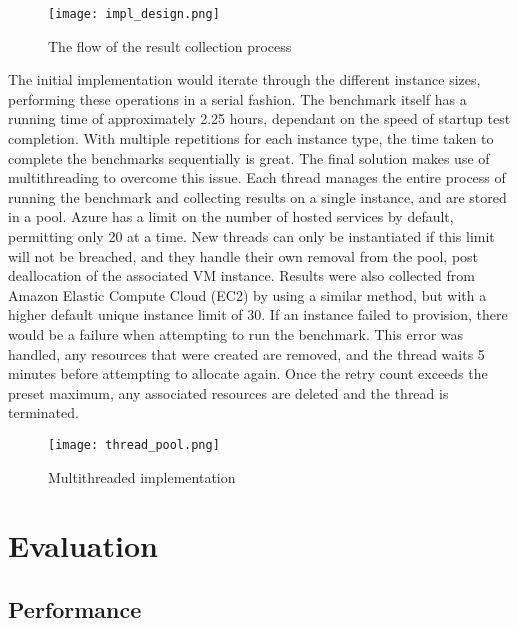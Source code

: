 \documentclass[conference]{IEEEtran}
\begin{document}
\begin{figure}[ht]
  \centering
  \texttt{[image: impl\_design.png]}
  \caption{The flow of the result collection process}
  \label{fig:impldesign}
\end{figure}

The initial implementation would iterate through the different instance sizes, performing these operations in a serial fashion. The benchmark itself has a running time of approximately 2.25 hours, dependant on the speed of startup test completion. With multiple repetitions for each instance type, the time taken to complete the benchmarks sequentially is great. The final solution makes use of multithreading to overcome this issue. Each thread manages the entire process of running the benchmark and collecting results on a single instance, and are stored in a pool. Azure has a limit on the number of hosted services by default, permitting only 20 at a time. New threads can only be instantiated if this limit will not be breached, and they handle their own removal from the pool, post deallocation of the associated VM instance. Results were also collected from Amazon Elastic Compute Cloud (EC2) by using a similar method, but with a higher default unique instance limit of 30. If an instance failed to provision, there would be a failure when attempting to run the benchmark. This error was handled, any resources that were created are removed, and the thread waits 5 minutes before attempting to allocate again. Once the retry count exceeds the preset maximum, any associated resources are deleted and the thread is terminated.

\begin{figure}[ht]
  \centering
  \texttt{[image: thread\_pool.png]}
  \caption{Multithreaded implementation}
  \label{fig:threadeddesign}
\end{figure}


\section{Evaluation}

\subsection{Performance}\label{sec:eval:performance}
\end{document}
